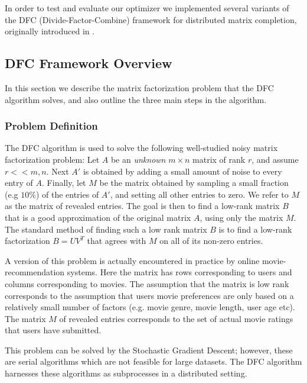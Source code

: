 In order to test and evaluate our optimizer we implemented several 
variants of the DFC (Divide-Factor-Combine) framework for distributed 
matrix completion, originally introduced in \cite{MTJ13}.

\subsection{DFC Framework Overview}
In this section we describe the matrix factorization problem that the DFC 
algorithm solves, and also outline the three main steps in the algorithm. 
\subsubsection{Problem Definition}
The DFC algorithm is used to solve the following well-studied noisy matrix 
factorization problem: Let $A$ be an {\em unknown} $m\times n$ matrix of 
rank $r$, and assume $r<<m,n$. Next $A'$ is obtained by adding a 
small amount of noise to every entry of $A$. Finally, let $M$ be the 
matrix obtained by sampling a small fraction (e.g $10\%$) of the entries 
of $A'$, and setting all other entries to zero. We refer to $M$ as the 
matrix of revealed entries. The goal is then to find a low-rank 
matrix $B$ that is a good approximation of the original matrix $A$, 
using only the matrix $M$. The standard method of finding such a low 
rank matrix $B$ is to find a low-rank factorization $B=UV^T$ that 
agrees with $M$ on all of its non-zero entries.

A version of this problem is actually encountered in practice by 
online movie-recommendation systems. Here the matrix has rows 
corresponding to users and columns corresponding to movies. 
The assumption that the matrix is low rank corresponds to the 
assumption that users movie preferences are only based on a relatively 
small number of factors (e.g. movie genre, movie length, user age etc). 
The matrix $M$ of revealed entries corresponds to the set of actual 
movie ratings that users have submitted.

This problem can be solved by the Stochastic Gradient Descent; 
however, these are serial
algorithms which are not feasible for large datasets. The DFC algorithm
harnesses these algorithms as subprocesses in a distributed setting.

